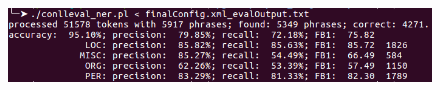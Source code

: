\documentclass[11pt, english]{article}
\begin{document}
\begin{figure}
    \centering
    \includegraphics[width=\linewidth, keepaspectratio]{gfx/finalEvalOut.png}
    \label{fig:finalResult}
\end{figure}
\end{document}
